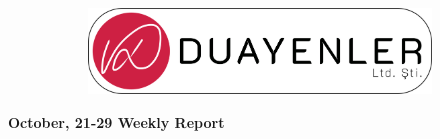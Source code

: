 \documentclass[a4paper,12pt]{article}
\begin{document}
	
\begin{figure}
	\vspace*{-.7cm}
	\centering
	\begin{figure}[H]
		\centering
		\setlength{\unitlength}{\textwidth} 
		\includegraphics[width=0.9\unitlength]{../../../Documents/logos/logo3-with-stroke}
	\end{figure}
\end{figure}
\vspace*{-1.7cm}
\begin{center}
	\Large\textbf{October, 21-29 Weekly Report}
	\end{center}
\end{document}

